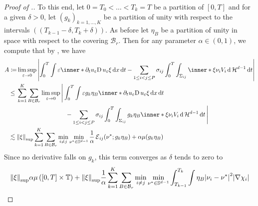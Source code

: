 \begin{proof}[Proof of .]
	To this end, let $ 0 = T_{ 0 } < \dotsc < T_{ k } = T $ be a partition of $ 
	[ 0 , T ] $ and for a given $ \delta > 0 $, let $ ( g_{ k } )_{ k = 1 , 
		\dotsc, K } $ be a partition of unity with respect to the intervals 
	$ \left( ( T_{ k - 1 } - \delta , T_{ k } + \delta ) \right) $. As before 
	let $ \eta_{ B } $ be a partition of unity in space with respect to the 
	covering $ \mathcal{ B }_{ r } $. 
	Then for any parameter $ \alpha \in ( 0 , 
	1 ) $, we compute that by , we have
	\begin{align*}
		A \coloneqq&
		\limsup_{ \varepsilon \to 0 }
		\abs{
			\int_{ 0 }^{ T }
			\int
			\varepsilon
			\inner*{ \partial_{ t } 
				u_{ \varepsilon } }{ \diff u_{ \varepsilon } \xi }
			\dd{ x }
			\dd{ t }
			-
			\sum_{ 1 \leq i < j \leq P }
			\sigma_{ i j }
			\int_{ 0 }^{ T }
			\int_{ \Sigma_{ i j } }
			\inner*{ \xi }{ \nu_{ i } }
			V_{ i }
			\dd{ \hm^{ d -1 } }
			\dd{ t }
		}
		\\
		\leq{} &
		\sum_{ k = 1 }^{ K }
		\sum_{ B \in \mathcal{ B }_{ r } }
		\limsup_{ \varepsilon \to 0 }
		\Bigg{|}
		\int_{ 0 }^{ T }
		\int
		\varepsilon
		g_{ k } \eta_{ B }
		\inner*{ 
			\partial_{ t } u_{ \varepsilon } }{ \diff 
			u_{ \varepsilon } \xi }
		\dd{ x }
		\dd{ t }
		\\
		& \qquad \qquad \qquad \qquad-
		\sum_{ 1 \leq i < j \leq P }
		\sigma_{ i j }
		\int_{ 0 }^{ T }
		\int_{ \Sigma_{ i j } }
		g_{ k } \eta_{ B }
		\inner*{\xi }{ \nu_{ i } }
		V_{ i }
		\dd{ \hm^{ d - 1 } }
		\dd{ t }					
		\Bigg{|}
		\\
		\lesssim{} &
		\norm{ \xi }_{ \mathrm{sup} }
		\sum_{ k = 1 }^{ K }
		\sum_{ B \in \mathcal{ B }_{ r } }
		\min_{ i \neq j }
		\min_{ \nu^{ \ast } \in \mathbb{ S }^{ d - 1 } }
		\frac{ 1 }{ \alpha }
		\tilt_excess_{ i j } ( \nu^{ \ast } ; g_{ k } \eta_{ 
			B } )
		+
		\alpha \mu ( g_{ k } \eta_{ B } )
	\end{align*}
	Since no derivative falls on $ g_{ k } $, this term converges as $ \delta $ 
	tends to zero to
	\begin{align}
		\label{error_for _convergence_of_velocity}
		\norm{ \xi }_{ \mathrm{sup} }
		\alpha \mu \left( [ 0 , T ] \times \flattorus \right)
		+
		\norm{ \xi }_{ \mathrm{sup} }
		\frac{ 1 }{ \alpha }
		\sum_{ k = 1 }^{ K }
		\sum_{ B \in \mathcal{ B }_{ r } }
		& \min_{ i \neq j }
		\min_{ \nu^{ \ast } \in \mathbb{ S }^{ d - 1 } }
		\int_{ T_{ k - 1 } }^{ T_{ k } }
		\int
		\eta_{ B } 
		\abs{ \nu_{ i } - \nu^{ \ast } }^{ 2 }
		\abs{ \nabla \chi_{ i } }
		\\

\end{align}
\end{proof}
